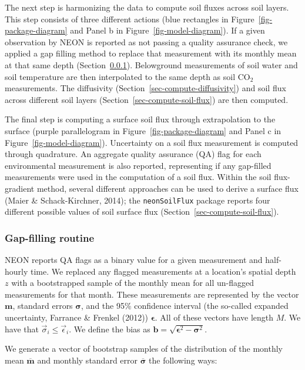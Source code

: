 \documentclass[
  letterpaper,
  DIV=11,
  numbers=noendperiod]{scrartcl}
\begin{document}
The next step is harmonizing the data to compute soil fluxes across soil
layers. This step consists of three different actions (blue rectangles
in Figure~\ref{fig-package-diagram} and Panel b in
Figure~\ref{fig-model-diagram}). If a given observation by NEON is
reported as not passing a quality assurance check, we applied a gap
filling method to replace that measurement with its monthly mean at that
same depth (Section~\ref{sec-gapfilling}). Belowground measurements of
soil water and soil temperature are then interpolated to the same depth
as soil CO\(_{2}\) measurements. The diffusivity
(Section~\ref{sec-compute-diffusivity}) and soil flux across different
soil layers (Section~\ref{sec-compute-soil-flux}) are then computed.

The final step is computing a surface soil flux through extrapolation to
the surface (purple parallelogram in Figure~\ref{fig-package-diagram}
and Panel c in Figure~\ref{fig-model-diagram}). Uncertainty on a soil
flux measurement is computed through quadrature. An aggregate quality
assurance (QA) flag for each environmental measurement is also reported,
representing if any gap-filled measurements were used in the computation
of a soil flux. Within the soil flux-gradient method, several different
approaches can be used to derive a surface flux (Maier \&
Schack-Kirchner, 2014); the \texttt{neonSoilFlux} package reports four
different possible values of soil surface flux
(Section~\ref{sec-compute-soil-flux}).

\subsubsection{Gap-filling routine}\label{sec-gapfilling}

NEON reports QA flags as a binary value for a given measurement and
half-hourly time. We replaced any flagged measurements at a location's
spatial depth \(z\) with a bootstrapped sample of the monthly mean for
all un-flagged measurements for that month. These measurements are
represented by the vector \(\mathbf{m}\), standard errors
\(\boldsymbol\sigma\), and the 95\% confidence interval (the so-called
expanded uncertainty, Farrance \& Frenkel (2012))
\(\boldsymbol\epsilon\). All of these vectors have length \(M\). We have
that \(\vec{\sigma}_{i}\leq\vec{\epsilon}_{i}\). We define the bias as
\(\mathbf{b}=\sqrt{\boldsymbol\epsilon^{2}-\boldsymbol\sigma^{2}}\).

We generate a vector of bootstrap samples of the distribution of the
monthly mean \(\overline{\boldsymbol{m}}\) and monthly standard error
\(\overline{\boldsymbol\sigma}\) the following ways:
\end{document}
